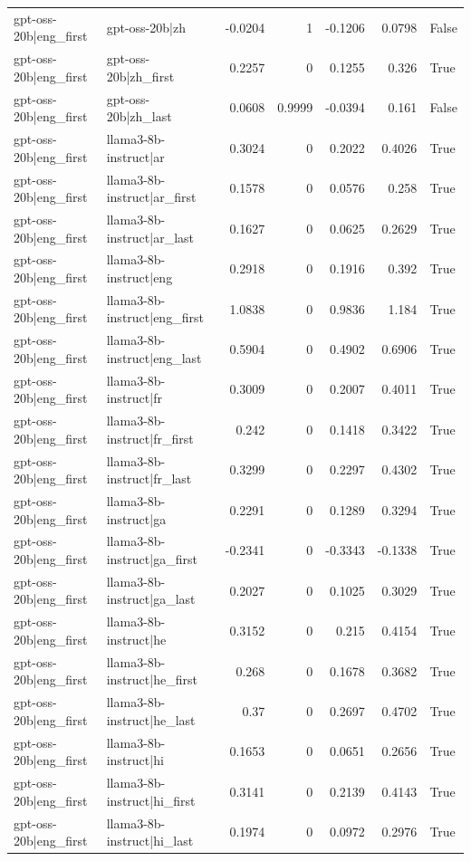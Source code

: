 \begin{table}
\begin{tabular}{l l r r r r l}
gpt-oss-20b|eng_first & gpt-oss-20b|zh & -0.0204 & 1 & -0.1206 & 0.0798 & False \\
gpt-oss-20b|eng_first & gpt-oss-20b|zh_first & 0.2257 & 0 & 0.1255 & 0.326 & True \\
gpt-oss-20b|eng_first & gpt-oss-20b|zh_last & 0.0608 & 0.9999 & -0.0394 & 0.161 & False \\
gpt-oss-20b|eng_first & llama3-8b-instruct|ar & 0.3024 & 0 & 0.2022 & 0.4026 & True \\
gpt-oss-20b|eng_first & llama3-8b-instruct|ar_first & 0.1578 & 0 & 0.0576 & 0.258 & True \\
gpt-oss-20b|eng_first & llama3-8b-instruct|ar_last & 0.1627 & 0 & 0.0625 & 0.2629 & True \\
gpt-oss-20b|eng_first & llama3-8b-instruct|eng & 0.2918 & 0 & 0.1916 & 0.392 & True \\
gpt-oss-20b|eng_first & llama3-8b-instruct|eng_first & 1.0838 & 0 & 0.9836 & 1.184 & True \\
gpt-oss-20b|eng_first & llama3-8b-instruct|eng_last & 0.5904 & 0 & 0.4902 & 0.6906 & True \\
gpt-oss-20b|eng_first & llama3-8b-instruct|fr & 0.3009 & 0 & 0.2007 & 0.4011 & True \\
gpt-oss-20b|eng_first & llama3-8b-instruct|fr_first & 0.242 & 0 & 0.1418 & 0.3422 & True \\
gpt-oss-20b|eng_first & llama3-8b-instruct|fr_last & 0.3299 & 0 & 0.2297 & 0.4302 & True \\
gpt-oss-20b|eng_first & llama3-8b-instruct|ga & 0.2291 & 0 & 0.1289 & 0.3294 & True \\
gpt-oss-20b|eng_first & llama3-8b-instruct|ga_first & -0.2341 & 0 & -0.3343 & -0.1338 & True \\
gpt-oss-20b|eng_first & llama3-8b-instruct|ga_last & 0.2027 & 0 & 0.1025 & 0.3029 & True \\
gpt-oss-20b|eng_first & llama3-8b-instruct|he & 0.3152 & 0 & 0.215 & 0.4154 & True \\
gpt-oss-20b|eng_first & llama3-8b-instruct|he_first & 0.268 & 0 & 0.1678 & 0.3682 & True \\
gpt-oss-20b|eng_first & llama3-8b-instruct|he_last & 0.37 & 0 & 0.2697 & 0.4702 & True \\
gpt-oss-20b|eng_first & llama3-8b-instruct|hi & 0.1653 & 0 & 0.0651 & 0.2656 & True \\
gpt-oss-20b|eng_first & llama3-8b-instruct|hi_first & 0.3141 & 0 & 0.2139 & 0.4143 & True \\
gpt-oss-20b|eng_first & llama3-8b-instruct|hi_last & 0.1974 & 0 & 0.0972 & 0.2976 & True \\

\end{tabular}
\end{table}
